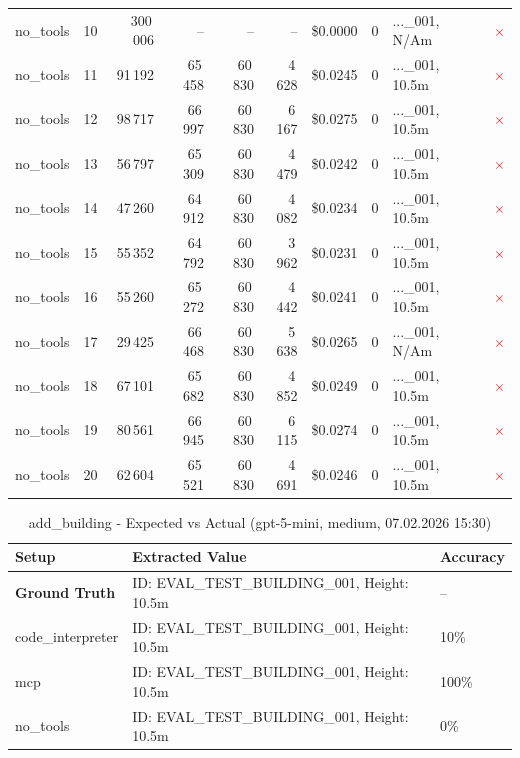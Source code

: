 \documentclass[a4paper,11pt]{article}
\begin{document}
\begin{table}[H]
{\begin{tabular}{l r r r r r r r l c}
no\_tools & 10 & 300\,006 & -- & -- & -- & \$0.0000 & 0 & ...\_001, N/Am & \textcolor{red}{\(\times\)} \\
no\_tools & 11 & 91\,192 & 65\,458 & 60\,830 & 4\,628 & \$0.0245 & 0 & ...\_001, 10.5m & \textcolor{red}{\(\times\)} \\
no\_tools & 12 & 98\,717 & 66\,997 & 60\,830 & 6\,167 & \$0.0275 & 0 & ...\_001, 10.5m & \textcolor{red}{\(\times\)} \\
no\_tools & 13 & 56\,797 & 65\,309 & 60\,830 & 4\,479 & \$0.0242 & 0 & ...\_001, 10.5m & \textcolor{red}{\(\times\)} \\
no\_tools & 14 & 47\,260 & 64\,912 & 60\,830 & 4\,082 & \$0.0234 & 0 & ...\_001, 10.5m & \textcolor{red}{\(\times\)} \\
no\_tools & 15 & 55\,352 & 64\,792 & 60\,830 & 3\,962 & \$0.0231 & 0 & ...\_001, 10.5m & \textcolor{red}{\(\times\)} \\
no\_tools & 16 & 55\,260 & 65\,272 & 60\,830 & 4\,442 & \$0.0241 & 0 & ...\_001, 10.5m & \textcolor{red}{\(\times\)} \\
no\_tools & 17 & 29\,425 & 66\,468 & 60\,830 & 5\,638 & \$0.0265 & 0 & ...\_001, N/Am & \textcolor{red}{\(\times\)} \\
no\_tools & 18 & 67\,101 & 65\,682 & 60\,830 & 4\,852 & \$0.0249 & 0 & ...\_001, 10.5m & \textcolor{red}{\(\times\)} \\
no\_tools & 19 & 80\,561 & 66\,945 & 60\,830 & 6\,115 & \$0.0274 & 0 & ...\_001, 10.5m & \textcolor{red}{\(\times\)} \\
no\_tools & 20 & 62\,604 & 65\,521 & 60\,830 & 4\,691 & \$0.0246 & 0 & ...\_001, 10.5m & \textcolor{red}{\(\times\)} \\
\bottomrule
\end{tabular}}
\end{table}

\begin{table}[H]
\centering
\scriptsize
\caption{add\_building - Expected vs Actual (gpt-5-mini, medium, 07.02.2026 15:30)}
\begin{tabular}{l l l}
\toprule
Setup & Extracted Value & Accuracy \\
\midrule
\textbf{Ground Truth} & ID: EVAL\_TEST\_BUILDING\_001, Height: 10.5m & -- \\
\midrule
code\_interpreter & ID: EVAL\_TEST\_BUILDING\_001, Height: 10.5m & 10\% \\
mcp & ID: EVAL\_TEST\_BUILDING\_001, Height: 10.5m & 100\% \\
no\_tools & ID: EVAL\_TEST\_BUILDING\_001, Height: 10.5m & 0\% \\
\bottomrule
\end{tabular}
\end{table}

\clearpage
\end{document}
